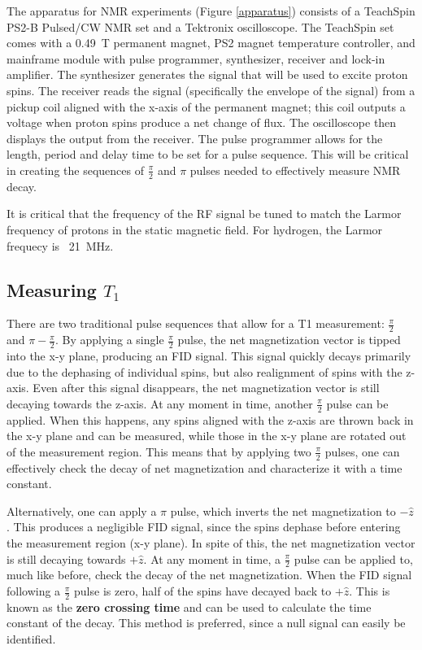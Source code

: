 \documentclass[
    floatfix,  %
    reprint,
    amsmath,
    amssymb,
    aps,
]{revtex4-2}
\newcommand{\halfpi}{\frac{\pi}{2}}
\begin{document}
The apparatus for NMR experiments (Figure \ref{apparatus}) consists of a TeachSpin PS2-B Pulsed/CW NMR set and a Tektronix oscilloscope. The TeachSpin set comes with a \SI{0.49}{\tesla} permanent magnet, PS2 magnet temperature controller, and mainframe module with pulse programmer, synthesizer, receiver and lock-in amplifier. The synthesizer generates the signal that will be used to excite proton spins. The receiver reads the signal (specifically the envelope of the signal) from a pickup coil aligned with the x-axis of the permanent magnet; this coil outputs a voltage when proton spins produce a net change of flux. The oscilloscope then displays the output from the receiver. The pulse programmer allows for the length, period and delay time to be set for a pulse sequence. This will be critical in creating the sequences of $\halfpi$ and $\pi$ pulses needed to effectively measure NMR decay.

It is critical that the frequency of the RF signal be tuned to match the Larmor frequency of protons in the static magnetic field. For hydrogen, the Larmor frequecy is ~\SI{21}{\mega\hertz}.






\subsection{Measuring $T_1$ \label{sec:measure-t1}}

There are two traditional pulse sequences that allow for a T1 measurement: $\halfpi$ and $\pi-\halfpi$. By applying a single $\halfpi$ pulse, the net magnetization vector is tipped into the x-y plane, producing an FID signal. This signal quickly decays primarily due to the dephasing of individual spins, but also realignment of spins with the z-axis. Even after this signal disappears, the net magnetization vector is still decaying towards the z-axis. At any moment in time, another $\halfpi$ pulse can be applied. When this happens, any spins aligned with the z-axis are thrown back in the x-y plane and can be measured, while those in the x-y plane are rotated out of the measurement region. This means that by applying two $\halfpi$ pulses, one can effectively check the decay of net magnetization and characterize it with a time constant.

Alternatively, one can apply a $\pi$ pulse, which inverts the net magnetization to $-\hat{z}$. This produces a negligible FID signal, since the spins dephase before entering the measurement region (x-y plane). In spite of this, the net magnetization vector is still decaying towards $+\hat{z}$. At any moment in time, a $\halfpi$ pulse can be applied to, much like before, check the decay of the net magnetization. When the FID signal following a $\halfpi$ pulse is zero, half of the spins have decayed back to $+\hat{z}$. This is known as the \textbf{zero crossing time} and can be used to calculate the time constant of the decay. This method is preferred, since a null signal can easily be identified.
\end{document}
